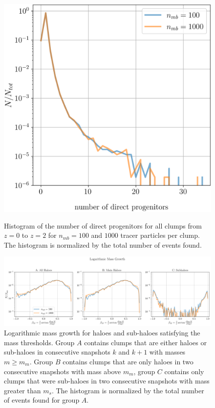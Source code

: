 \begin{figure}
	\centering
	\includegraphics[width=.9\linewidth, keepaspectratio]{images/tree-statistics-sussing-threshold/branching-ratio-ntrace.png}\\%
	\caption{
		Histogram of the number of direct progenitors for all clumps from $z = 0$ to $z = 2$ for $n_{mb} = 100$ and $1000$ tracer particles per clump.
		The histogram is normalized by the total number of events found.
	}%
	\label{fig:sussing-branching-ratio}
\end{figure}


\begin{figure}
	\centering
	\includegraphics[width=\textwidth, keepaspectratio]{images/tree-statistics-sussing-threshold/mass_growth-ntrace.png}%
	\caption{
		Logarithmic mass growth for haloes and sub-haloes satisfying the mass thresholds.
		Group $A$ contains clumps that are either haloes or sub-haloes in consecutive snapshots $k$ and $k+1$ with masses $m \geq m_{m}$.
		Group $B$ contains clumps that are only haloes in two consecutive snapshots with mass above $m_{m}$, group $C$ contains only clumps that were sub-haloes in two consecutive snapshots with mass greater than $m_{s}$.
		The histogram is normalized by the total number of events found for group $A$.
	}%
	\label{fig:sussing-mass-growth}
\end{figure}

